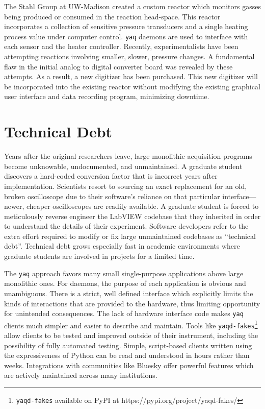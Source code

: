 \documentclass[aip, amsmath, amssymb, reprint,]{revtex4-2}
\newcommand\yaq{\texttt{yaq}}
\begin{document}
The Stahl Group at UW-Madison created a custom reactor which monitors gasses being produced or consumed in the reaction head-space.  \cite{SalazarChaseA2021a}
This reactor incorporates a collection of sensitive pressure transducers and a single heating process value under computer control.
\yaq{} daemons are used to interface with each sensor and the heater controller.
Recently, experimentalists have been attempting reactions involving smaller, slower, pressure changes.
A fundamental flaw in the initial analog to digital converter board was revealed by these attempts.
As a result, a new digitizer has been purchased.
This new digitizer will be incorporated into the existing reactor without modifying the existing graphical user interface and data recording program, minimizing downtime.

\section{Technical Debt}

Years after the original researchers leave, large monolithic acquisition programs become unknowable, undocumented, and unmaintained.
A graduate student discovers a hard-coded conversion factor that is incorrect years after implementation.
Scientists resort to sourcing an exact replacement for an old, broken oscilloscope due to their software's reliance on that particular interface---newer, cheaper oscilloscopes are readily available.
A graduate student is forced to meticulously reverse engineer the LabVIEW codebase that they inherited in order to understand the details of their experiment.
Software developers refer to the extra effort required to modify or fix large unmaintained codebases as ``technical debt''.\cite{Allman_2012}
Technical debt grows especially fast in academic environments where graduate students are involved in projects for a limited time.

The \yaq{} approach favors many small single-purpose applications above large monolithic ones.
For daemons, the purpose of each application is obvious and unambiguous.
There is a strict, well defined interface which explicitly limits the kinds of interactions that are provided to the hardware, thus limiting opportunity for unintended consequences.
The lack of hardware interface code makes \yaq{} clients much simpler and easier to describe and maintain.
Tools like \texttt{yaqd-fakes}\footnote{\texttt{yaqd-fakes} available on PyPI at https://pypi.org/project/yaqd-fakes/} allow clients to be tested and improved outside of their instrument, including the possibility of fully automated testing.
Simple, script-based clients written using the expressiveness of Python can be read and understood in hours rather than weeks.
Integrations with communities like Bluesky offer powerful features which are actively maintained across many institutions.
\end{document}
